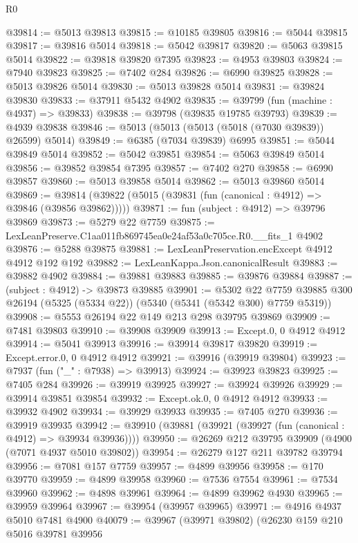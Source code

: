 \begin{lexlean}{R0}
\begin{coremodule}
@39814 := @5013 @39813
@39815 := @10185 @39805
@39816 := @5044 @39815
@39817 := @39816 @5014
@39818 := @5042 @39817
@39820 := @5063 @39815 @5014
@39822 := @39818 @39820 @7395
@39823 := @4953 @39803
@39824 := @7940 @39823
@39825 := @7402 @284
@39826 := @6990 @39825
@39828 := @5013 @39826 @5014
@39830 := @5013 @39828 @5014
@39831 := @39824 @39830
@39833 := @37911 @5432 @4902
@39835 := @39799 (fun (machine : @4937) => @39833)
@39838 := @39798 (@39835 @19785 @39793)
@39839 := @4939 @39838
@39846 := @5013 (@5013 (@5013 (@5018 (@7030 @39839)) @26599) @5014)
@39849 := @6385 (@7034 @39839) @6995
@39851 := @5044 @39849 @5014
@39852 := @5042 @39851
@39854 := @5063 @39849 @5014
@39856 := @39852 @39854 @7395
@39857 := @7402 @270
@39858 := @6990 @39857
@39860 := @5013 @39858 @5014
@39862 := @5013 @39860 @5014
@39869 := @39814 (@39822 (@5015 (@39831 (fun (canonical : @4912) => @39846 (@39856 @39862)))))
@39871 := fun (subject : @4912) => @39796 @39869
@39873 := @5279 @22 @7759
@39875 := LexLeanPreserve.C1aa011fb869745ea0e24af53a0c705ce.R0.__fits_1 @4902
@39876 := @5288 @39875
@39881 := LexLeanPreservation.encExcept @4912 @4912 @192 @192
@39882 := LexLeanKappa.Json.canonicalResult
@39883 := @39882 @4902
@39884 := @39881 @39883
@39885 := @39876 @39884
@39887 := (subject : @4912) -> @39873 @39885
@39901 := @5302
    @22
    @7759
    @39885
    @300
    @26194
    (@5325 (@5334 @22))
    (@5340 (@5341 (@5342 @300) @7759 @5319))
@39908 := @5553 @26194 @22 @149 @213 @298 @39795 @39869
@39909 := @7481 @39803
@39910 := @39908 @39909
@39913 := Except.{0, 0} @4912 @4912
@39914 := @5041 @39913
@39916 := @39914 @39817 @39820
@39919 := Except.error.{0, 0} @4912 @4912
@39921 := @39916 (@39919 @39804)
@39923 := @7937 (fun ("_" : @7938) => @39913)
@39924 := @39923 @39823
@39925 := @7405 @284
@39926 := @39919 @39925
@39927 := @39924 @39926
@39929 := @39914 @39851 @39854
@39932 := Except.ok.{0, 0} @4912 @4912
@39933 := @39932 @4902
@39934 := @39929 @39933
@39935 := @7405 @270
@39936 := @39919 @39935
@39942 := @39910 (@39881 (@39921 (@39927 (fun (canonical : @4912) => @39934 @39936))))
@39950 := @26269 @212 @39795 @39909 (@4900 (@7071 @4937 @5010 @39802))
@39954 := @26279 @127 @211 @39782 @39794
@39956 := @7081 @157 @7759
@39957 := @4899 @39956
@39958 := @170 @39770
@39959 := @4899 @39958
@39960 := @7536 @7554
@39961 := @7534 @39960
@39962 := @4898 @39961
@39964 := @4899 @39962 @4930
@39965 := @39959 @39964
@39967 := @39954 (@39957 @39965)
@39971 := @4916 @4937 @5010 @7481 @4900
@40079 := @39967
    (@39971 @39802)
    (@26230
      @159
      @210
      @5016
      @39781
      @39956

\end{coremodule}
\end{lexlean}
